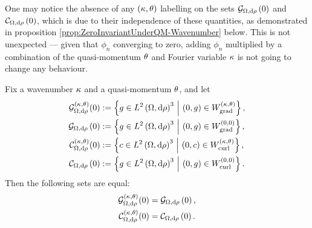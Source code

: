 One may notice the absence of any $\left( \kappa, \theta \right)$ labelling on the sets $\mathcal{G}_{ \Omega, \mathrm{d}\rho}\left( 0 \right)$ and $\mathcal{C}_{ \Omega, \mathrm{d}\rho}\left( 0 \right)$, which is due to their independence of these quantities, as demonstrated in proposition \ref{prop:ZeroInvariantUnderQM-Wavenumber} below.
This is not unexpected --- given that $\phi_n$ converging to zero, adding $\phi_n$ multiplied by a combination of the quasi-momentum $\theta$ and Fourier variable $\kappa$ is not going to change any behaviour.
\begin{prop} \label{prop:ZeroInvariantUnderQM-Wavenumber}
	Fix a wavenumber $\kappa$ and a quasi-momentum $\theta$, and let
	\begin{align*}
		\mathcal{G}_{\Omega,\mathrm{d}\rho}^{\left( \kappa, \theta \right)}(0) &:= \left\{  g\in L^{2}\left( \Omega,\mathrm{d} \rho \right)^3 \ \middle\vert \  \left( 0,g \right)\in W^{\left( \kappa, \theta \right)}_\mathrm{grad}  \right\}, \\
		\mathcal{G}_{ \Omega, \mathrm{d}\rho}\left( 0 \right) &:= \left\{  g\in L^{2}\left( \Omega,\mathrm{d} \rho \right)^3 \ \middle\vert \  \left( 0,g \right)\in W^{\left( 0, 0 \right)}_\mathrm{grad}  \right\}, \\
		\mathcal{C}_{\Omega,\mathrm{d}\rho}^{\left( \kappa, \theta \right)}(0) &:= \left\{  c\in L^{2}\left( \Omega,\mathrm{d} \rho \right)^3 \ \middle\vert \  \left( 0,c \right)\in W^{\left( \kappa, \theta \right)}_\mathrm{curl}  \right\}, \\
		\mathcal{C}_{ \Omega, \mathrm{d}\rho}\left( 0 \right) &:= \left\{  g\in L^{2}\left( \Omega,\mathrm{d} \rho \right)^3 \ \middle\vert \  \left( 0,g \right)\in W^{\left( 0, 0 \right)}_\mathrm{curl}  \right\}.
	\end{align*}
	Then the following sets are equal:
	\begin{align*}
		\mathcal{G}_{\Omega,\mathrm{d}\rho}^{\left( \kappa, \theta \right)}(0) &= \mathcal{G}_{ \Omega, \mathrm{d}\rho}\left( 0 \right), \\
		\mathcal{C}_{\Omega,\mathrm{d}\rho}^{\left( \kappa, \theta \right)}(0) &= \mathcal{C}_{ \Omega, \mathrm{d}\rho}\left( 0 \right).
	\end{align*}
\end{prop}
